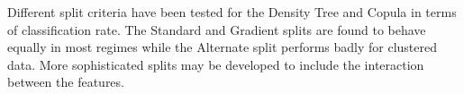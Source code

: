 \documentclass[draft]{article}
\begin{document}
Different split criteria have been tested for the Density Tree and Copula in terms
of classification rate. The Standard and Gradient splits are found
to behave equally in most regimes while the Alternate split performs badly for
clustered data.
More sophisticated splits may be developed to include the interaction between the features.
\newline
\end{document}
